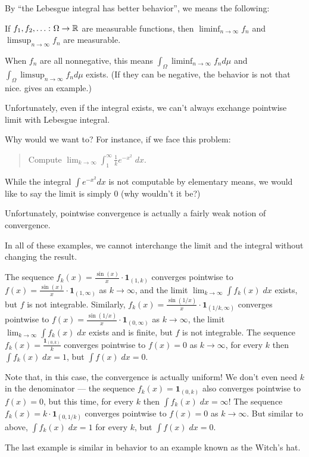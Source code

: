 By ``the Lebesgue integral has better behavior'', we means the following:
\begin{proposition}
	If $f_1, f_2, \dots \colon \Omega \to \mathbb R$ are measurable functions,
	then $\liminf_{n \to \infty} f_n$ and $\limsup_{n \to \infty} f_n$ are measurable.
\end{proposition}
When $f_n$ are all nonnegative, this means
$\int_\Omega \liminf_{n \to \infty} f_n d\mu$ and $\int_\Omega \limsup_{n \to \infty} f_n d\mu$ exists.
(If they can be negative, the behavior is not that nice.  gives an example.)

Unfortunately, even if the integral exists, we can't always exchange pointwise limit with Lebesgue
integral.

Why would we want to? For instance, if we face this problem:
\begin{quote}
	Compute $\lim_{k \to \infty} \int_1^\infty \frac{1}{k} e^{-x^2} \; dx$.
\end{quote}
While the integral $\int e^{-x^2} dx$ is not computable by elementary means,
we would like to say the limit is simply $0$ (why wouldn't it be?)

Unfortunately, pointwise convergence is actually a fairly weak notion of convergence.

\begin{example}
	\label{ex:failure_interchange_lim_int}
	In all of these examples, we cannot interchange the limit and the integral
	without changing the result.
	\begin{itemize}
		\ii The sequence $f_k(x) = \frac{\sin(x)}{x} \cdot \mathbf{1}_{(1, k)}$ converges pointwise to
		$f(x) = \frac{\sin(x)}{x} \cdot \mathbf{1}_{(1, \infty)}$ as $k \to \infty$,
		and the limit $\lim_{k \to \infty} \int f_k(x) \; dx$ exists, but $f$ is not integrable.
		\ii Similarly, $f_k(x) = \frac{\sin(1/x)}{x} \cdot \mathbf{1}_{(1/k, \infty)}$
		converges pointwise to $f(x) = \frac{\sin(1/x)}{x} \cdot \mathbf{1}_{(0, \infty)}$
		as $k \to \infty$,
		the limit $\lim_{k \to \infty} \int f_k(x) \; dx$ exists and is finite,
		but $f$ is not integrable.
		\ii The sequence $f_k(x) = \frac{\mathbf{1}_{(0, k)}}{k}$ converges pointwise to $f(x)=0$ as $k
		\to \infty$, for every $k$ then $\int f_k(x) \; dx=1$, but $\int f(x) \; dx=0$.

		Note that, in this case, the convergence is actually uniform!
		\ii We don't even need $k$ in the denominator --- the sequence $f_k(x) = \mathbf{1}_{(0, k)}$ also
		converges pointwise to $f(x)=0$, but this time, for every $k$ then $\int f_k(x) \; dx=\infty$!
		\ii The sequence $f_k(x) = k \cdot \mathbf{1}_{(0, 1/k)}$ converges pointwise to $f(x)=0$ as $k
		\to \infty$. But similar to above, $\int f_k(x) \; dx=1$ for every $k$, but
		$\int f(x) \; dx=0$.
	\end{itemize}
	The last example is similar in behavior to an example known as the Witch's hat.\footnotemark
\end{example}

